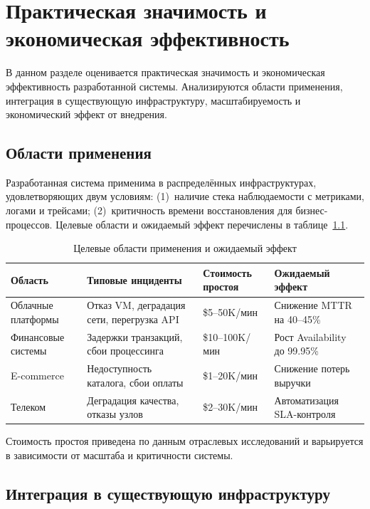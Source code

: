 \chapter{Практическая значимость и экономическая эффективность}\label{ch:economic}

В данном разделе оценивается практическая значимость и экономическая эффективность разработанной системы. Анализируются области применения, интеграция в существующую инфраструктуру, масштабируемость и экономический эффект от внедрения.

\section{Области применения}

Разработанная система применима в распределённых инфраструктурах, удовлетворяющих двум условиям: (1)~наличие стека наблюдаемости с метриками, логами и трейсами; (2)~критичность времени восстановления для бизнес-процессов. Целевые области и ожидаемый эффект перечислены в таблице~\ref{tab:application_areas}.

\begin{table}[H]
\centering
\caption{Целевые области применения и ожидаемый эффект}
\label{tab:application_areas}
\begin{tabular}{|p{2.8cm}|p{3.5cm}|p{2.5cm}|p{3.5cm}|}
\hline
\textbf{Область} & \textbf{Типовые инциденты} & \textbf{Стоимость простоя} & \textbf{Ожидаемый эффект} \\
\hline
Облачные платформы & Отказ VM, деградация сети, перегрузка API & \$5--50K/мин & Снижение MTTR на 40--45\% \\
\hline
Финансовые системы & Задержки транзакций, сбои процессинга & \$10--100K/мин & Рост Availability до 99.95\% \\
\hline
E-commerce & Недоступность каталога, сбои оплаты & \$1--20K/мин & Снижение потерь выручки \\
\hline
Телеком & Деградация качества, отказы узлов & \$2--30K/мин & Автоматизация SLA-контроля \\
\hline
\end{tabular}
\end{table}

Стоимость простоя приведена по данным отраслевых исследований \cite{amazon_outage_cost} и варьируется в зависимости от масштаба и критичности системы.

\section{Интеграция в существующую инфраструктуру}

